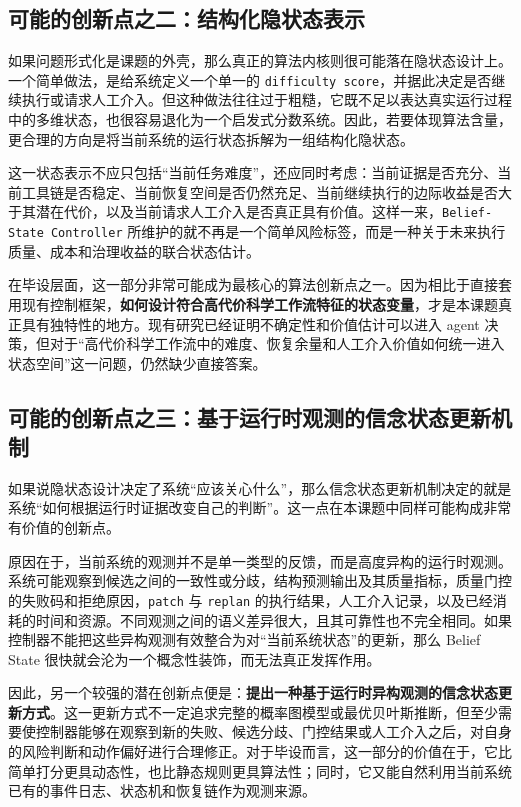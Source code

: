 \subsection{可能的创新点之二：结构化隐状态表示}

如果问题形式化是课题的外壳，那么真正的算法内核则很可能落在隐状态设计上。一个简单做法，是给系统定义一个单一的 \texttt{difficulty score}，并据此决定是否继续执行或请求人工介入。但这种做法往往过于粗糙，它既不足以表达真实运行过程中的多维状态，也很容易退化为一个启发式分数系统。因此，若要体现算法含量，更合理的方向是将当前系统的运行状态拆解为一组结构化隐状态。

这一状态表示不应只包括“当前任务难度”，还应同时考虑：当前证据是否充分、当前工具链是否稳定、当前恢复空间是否仍然充足、当前继续执行的边际收益是否大于其潜在代价，以及当前请求人工介入是否真正具有价值。这样一来，\texttt{Belief-State Controller} 所维护的就不再是一个简单风险标签，而是一种关于未来执行质量、成本和治理收益的联合状态估计。

在毕设层面，这一部分非常可能成为最核心的算法创新点之一。因为相比于直接套用现有控制框架，\textbf{如何设计符合高代价科学工作流特征的状态变量}，才是本课题真正具有独特性的地方。现有研究已经证明不确定性和价值估计可以进入 agent 决策，但对于“高代价科学工作流中的难度、恢复余量和人工介入价值如何统一进入状态空间”这一问题，仍然缺少直接答案。

\subsection{可能的创新点之三：基于运行时观测的信念状态更新机制}

如果说隐状态设计决定了系统“应该关心什么”，那么信念状态更新机制决定的就是系统“如何根据运行时证据改变自己的判断”。这一点在本课题中同样可能构成非常有价值的创新点。

原因在于，当前系统的观测并不是单一类型的反馈，而是高度异构的运行时观测。系统可能观察到候选之间的一致性或分歧，结构预测输出及其质量指标，质量门控的失败码和拒绝原因，\texttt{patch} 与 \texttt{replan} 的执行结果，人工介入记录，以及已经消耗的时间和资源。不同观测之间的语义差异很大，且其可靠性也不完全相同。如果控制器不能把这些异构观测有效整合为对“当前系统状态”的更新，那么 Belief State 很快就会沦为一个概念性装饰，而无法真正发挥作用。

因此，另一个较强的潜在创新点便是：\textbf{提出一种基于运行时异构观测的信念状态更新方式}。这一更新方式不一定追求完整的概率图模型或最优贝叶斯推断，但至少需要使控制器能够在观察到新的失败、候选分歧、门控结果或人工介入之后，对自身的风险判断和动作偏好进行合理修正。对于毕设而言，这一部分的价值在于，它比简单打分更具动态性，也比静态规则更具算法性；同时，它又能自然利用当前系统已有的事件日志、状态机和恢复链作为观测来源。

